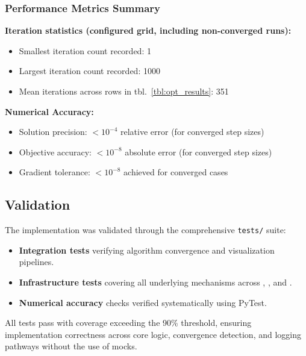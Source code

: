 \documentclass[
  english,
]{article}
\providecommand{\tightlist}{%
  \setlength{\itemsep}{0pt}\setlength{\parskip}{0pt}}
\begin{document}
\subsubsection{Performance Metrics
Summary}\label{performance-metrics-summary}

\textbf{Iteration statistics (configured grid, including non-converged
runs):}

\begin{itemize}
\tightlist
\item
  Smallest iteration count recorded: 1
\item
  Largest iteration count recorded: 1000
\item
  Mean iterations across rows in tbl.~\ref{tbl:opt_results}: 351
\end{itemize}

\textbf{Numerical Accuracy:}

\begin{itemize}
\tightlist
\item
  Solution precision: \(< 10^{-4}\) relative error (for converged step
  sizes)
\item
  Objective accuracy: \(< 10^{-8}\) absolute error (for converged step
  sizes)
\item
  Gradient tolerance: \(< 10^{-8}\) achieved for converged cases
\end{itemize}

\subsection{Validation}\label{validation}

The implementation was validated through the comprehensive
\texttt{tests/} suite:

\begin{itemize}
\tightlist
\item
  \textbf{Integration tests} verifying algorithm convergence and
  visualization pipelines.
\item
  \textbf{Infrastructure tests} covering all underlying mechanisms
  across ,
  , and
  .
\item
  \textbf{Numerical accuracy} checks verified systematically using
  PyTest.
\end{itemize}

All tests pass with coverage exceeding the 90\% threshold, ensuring
implementation correctness across core logic, convergence detection, and
logging pathways without the use of mocks.
\end{document}
